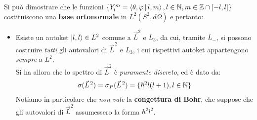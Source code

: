 \documentclass[../../FisicaTeorica.tex]{subfiles}
\begin{document}
Si può dimostrare che le funzioni $\{Y^m_l = \Braket{\theta,\varphi|l,m}, l\in \mathbb{N}, m\in \mathbb{Z}\cap [-l,l]\}$ costituiscono una \textbf{base ortonormale} in $L^2(S^2, d\Omega)$ e pertanto:
\begin{itemize}
\item Esiste un autoket $\Ket{l,l} \in L^2$ comune a $\vec{L}^2$ e $L_3$, da cui, tramite $L_-$, si possono costruire \textit{tutti} gli autovalori di $\vec{L}^{\,2}$ e $L_3$, i cui rispettivi autoket appartengono \textit{sempre} a $L^2$.\\
Si ha allora che lo spettro di $\vec{L}^2$ è \textit{puramente discreto}, ed è dato da:
\begin{align*}
\sigma(\vec{L}^{\,2})=\sigma_P(\vec{L}^{\,2}) = \{\hbar^2 l(l+1), l\in \mathbb{N}\}
\end{align*}
Notiamo in particolare che \textit{non vale} la \textbf{congettura di Bohr}, che suppose che gli autovalori di $\vec{L}^2$ assumessero la forma $\hbar^2 l^2$.\\


\end{itemize}
\end{document}

